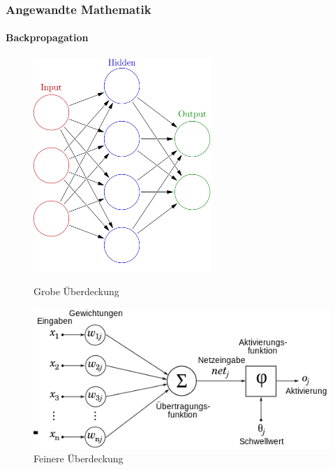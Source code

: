 \documentclass{beamer}
\begin{document}
\begin{frame}
    \frametitle{Angewandte Mathematik}
\framesubtitle{Backpropagation}
 \begin{figure}[!tbp]
  \centering
  \begin{minipage}[b]{0.45\textwidth}
    \includegraphics[width=0.6\textwidth]{images/499px-Colored_neural_network}
    \caption{Grobe Überdeckung}
  \end{minipage}
  \hfill
  \begin{minipage}[b]{0.45\textwidth}
    \includegraphics[width=1.0\textwidth]{images/500px-NeuronModel_deutsch}
    \caption{Feinere Überdeckung}
  \end{minipage}
\end{figure}
 \end{frame}
\end{document}

